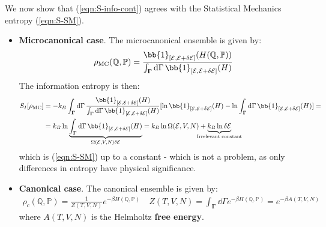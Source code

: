 \documentclass[../template.tex]{subfiles}
\begin{document}
\begin{enumerate}
    We now show that (\ref{eqn:S-info-cont}) agrees with the Statistical Mechanics entropy (\ref{eqn:S-SM}).
    \begin{itemize}
        \item \textbf{Microcanonical case}. The microcanonical ensemble is given by:
        \begin{align*}
            \rho_{\mathrm{MC}}(\mathbb{Q}, \mathbb{P}) = \frac{\bb{1}_{[\mathcal{E}, \mathcal{E} + \delta \mathcal{E}]} (H(\mathbb{Q}, \mathbb{P}))}{\int_{\bm{\Gamma}} \dd{\Gamma} \bb{1}_{[\mathcal{E}, \mathcal{E}+ \delta \mathcal{E}]}(H)}
        \end{align*} 
        The information entropy is then:
        \begin{align*}
            S_I[\rho_{\mathrm{MC}}] &= -k_B \int_{\bm{\Gamma}} \dd{\Gamma} \frac{\bb{1}_{[\mathcal{E}, \mathcal{E}+ \delta \mathcal{E}]}(H)}{\int_{\bm{\Gamma}} \dd{\Gamma} \bb{1}_{[\mathcal{E}, \mathcal{E}+ \delta \mathcal{E}]}(H)}  [\ln \bb{1}_{[\mathcal{E}, \mathcal{E}+ \delta \mathcal{E}]}(H) - \ln \int_{\bm{\Gamma} }\dd{\Gamma} \bb{1}_{[\mathcal{E}, \mathcal{E}+ \delta \mathcal{E}]}(H)] =\\
            &= k_B \ln\underbrace{ \int_{\bm{\Gamma}} \dd{\Gamma} \bb{1}_{[\mathcal{E}, \mathcal{E}+ \delta \mathcal{E}]}(H)}_{\Omega(\mathcal{E}, V, N) \delta \mathcal{E}} = k_B \ln \Omega(\mathcal{E}, V, N) + \underbrace{k_B \ln \delta \mathcal{E}}_{\mathclap{\text{Irrelevant constant}}}
        \end{align*}
        which is (\ref{eqn:S-SM}) up to a constant - which is not a problem, as only differences in entropy have physical significance.
        \item \textbf{Canonical case}. The canonical ensemble is given by:
        \begin{align*}
            \rho_c(\mathbb{Q}, \mathbb{P}) = \frac{1}{Z(T, V, N)} e^{-\beta H(\mathbb{Q}, \mathbb{P})} \quad Z(T,V,N) = \int_{\bm{\Gamma}} \dd{\Gamma} e^{- \beta H(\mathbb{Q}, \mathbb{P})} = e^{-\beta A(T, V, N)}
        \end{align*} 
        where $A(T,V,N)$ is the Helmholtz \textbf{free energy}.
        

\end{itemize}
\end{enumerate}
\end{document}
